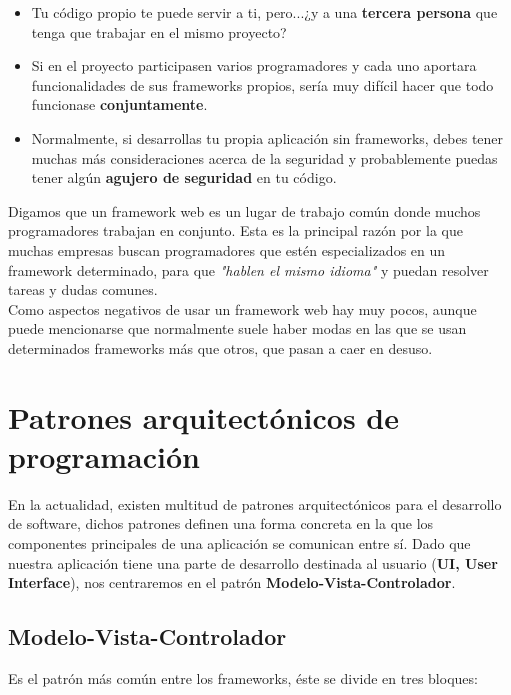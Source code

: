     \begin{itemize}
        \item Tu código propio te puede servir a ti, pero...¿y a una \textbf{tercera persona}
        que tenga que trabajar en el mismo proyecto?
        \item Si en el proyecto participasen varios programadores y cada uno aportara
        funcionalidades de sus frameworks propios, sería muy difícil hacer que todo
        funcionase \textbf{conjuntamente}.
        \item Normalmente, si desarrollas tu propia aplicación sin frameworks, debes
        tener muchas más consideraciones acerca de la seguridad y probablemente puedas
        tener algún \textbf{agujero de seguridad} en tu código.
    \end{itemize}

Digamos que un framework web es un lugar de trabajo común donde muchos programadores
trabajan en conjunto. Esta es la principal razón por la que muchas empresas buscan
programadores que estén especializados en un framework determinado, para que
\textit{"hablen el mismo idioma"} y puedan resolver tareas y dudas comunes.\\

Como aspectos negativos de usar un framework web hay muy pocos, aunque puede mencionarse
que normalmente suele haber modas en las que se usan determinados frameworks más que otros,
que pasan a caer en desuso.\\


\section{Patrones arquitectónicos de programación} \label{sec:architectural-patterns}
En la actualidad, existen multitud de patrones arquitectónicos para el desarrollo de
software, dichos patrones definen una forma concreta en la que los componentes principales
de una aplicación se comunican entre sí. Dado que nuestra aplicación tiene una parte de
desarrollo destinada al usuario (\textbf{UI, User Interface}), nos centraremos en el patrón
\textbf{Modelo-Vista-Controlador}.

\subsection{Modelo-Vista-Controlador} \label{sec:mvc}
Es el patrón más común entre los frameworks, éste se divide en tres bloques:

